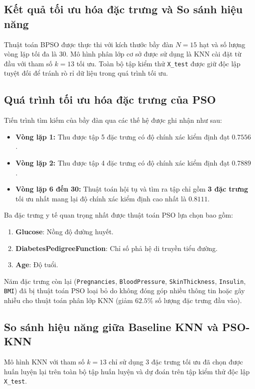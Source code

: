 \documentclass[a4paper,12pt]{report}
\begin{document}
\begin{itemize}
\section{Kết quả tối ưu hóa đặc trưng và So sánh hiệu năng}
Thuật toán BPSO được thực thi với kích thước bầy đàn $N = 15$ hạt và số lượng vòng lặp tối đa là $30$. Mô hình phân lớp cơ sở được sử dụng là KNN cài đặt từ đầu với tham số $k = 13$ tối ưu. Toàn bộ tập kiểm thử \texttt{X\_test} được giữ độc lập tuyệt đối để tránh rò rỉ dữ liệu trong quá trình tối ưu.

\subsection{Quá trình tối ưu hóa đặc trưng của PSO}
Tiến trình tìm kiếm của bầy đàn qua các thế hệ được ghi nhận như sau:
\begin{itemize}
    \item \textbf{Vòng lặp 1:} Thu được tập 5 đặc trưng có độ chính xác kiểm định đạt $0.7556$.
    \item \textbf{Vòng lặp 2:} Thu được tập 4 đặc trưng có độ chính xác kiểm định đạt $0.7889$.
    \item \textbf{Vòng lặp 6 đến 30:} Thuật toán hội tụ và tìm ra tập chỉ gồm \textbf{3 đặc trưng} tối ưu nhất mang lại độ chính xác kiểm định cao nhất là \textbf{$0.8111$}.
\end{itemize}

Ba đặc trưng y tế quan trọng nhất được thuật toán PSO lựa chọn bao gồm:
\begin{enumerate}
    \item \textbf{Glucose}: Nồng độ đường huyết.
    \item \textbf{DiabetesPedigreeFunction}: Chỉ số phả hệ di truyền tiểu đường.
    \item \textbf{Age}: Độ tuổi.
\end{enumerate}
Năm đặc trưng còn lại (\texttt{Pregnancies}, \texttt{BloodPressure}, \texttt{SkinThickness}, \texttt{Insulin}, \texttt{BMI}) đã bị thuật toán PSO loại bỏ do không đóng góp nhiều thông tin hoặc gây nhiễu cho thuật toán phân lớp KNN (giảm $62.5\%$ số lượng đặc trưng đầu vào).

\subsection{So sánh hiệu năng giữa Baseline KNN và PSO-KNN}
Mô hình KNN với tham số $k=13$ chỉ sử dụng 3 đặc trưng tối ưu đã chọn được huấn luyện lại trên toàn bộ tập huấn luyện và dự đoán trên tập kiểm thử độc lập \texttt{X\_test}.


\end{itemize}
\end{document}
